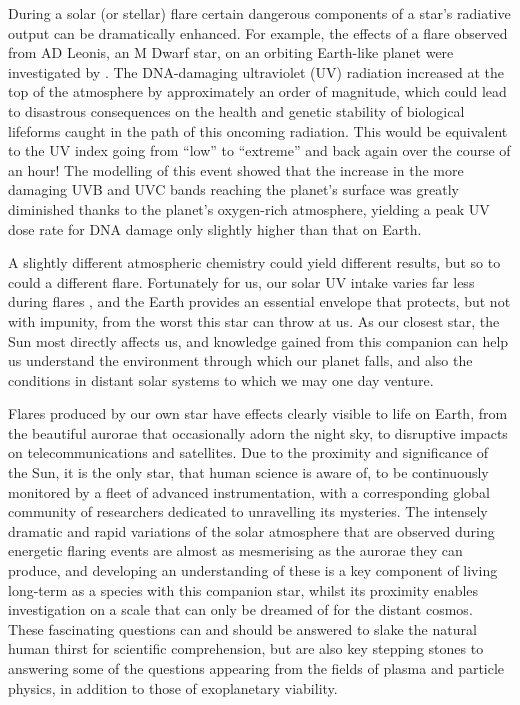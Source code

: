 During a solar (or stellar) flare certain dangerous components of a star's radiative output can be dramatically enhanced.
For example, the effects of a flare observed from AD Leonis, an M Dwarf star, on an orbiting Earth-like planet were investigated by \citet{Segura2010}.
The DNA-damaging ultraviolet (UV) radiation increased at the top of the atmosphere by approximately an order of magnitude, which could lead to disastrous consequences on the health and genetic stability of biological lifeforms caught in the path of this oncoming radiation.
This would be equivalent to the UV index going from ``low'' to ``extreme'' and back again over the course of an hour!
The modelling of this event showed that the increase in the more damaging UVB and UVC bands reaching the planet's surface was greatly diminished thanks to the planet's oxygen-rich atmosphere, yielding a peak UV dose rate for DNA damage only slightly higher than that on Earth.

A slightly different atmospheric chemistry could yield different results, but so to could a different flare.
Fortunately for us, our solar UV intake varies far less during flares \citep[e.g.][]{Woods2006}, and the Earth provides an essential envelope that protects, but not with impunity, from the worst this star can throw at us.
As our closest star, the Sun most directly affects us, and knowledge gained from this companion can help us understand the environment through which our planet falls, and also the conditions in distant solar systems to which we may one day venture.

Flares produced by our own star have effects clearly visible to life on Earth, from the beautiful aurorae that occasionally adorn the night sky, to disruptive impacts on telecommunications and satellites.
Due to the proximity and significance of the Sun, it is the only star, that human science is aware of, to be continuously monitored by a fleet of advanced instrumentation, with a corresponding global community of researchers dedicated to unravelling its mysteries.
The intensely dramatic and rapid variations of the solar atmosphere that are observed during energetic flaring events are almost as mesmerising as the aurorae they can produce, and developing an understanding of these is a key component of living long-term as a species with this companion star, whilst its proximity enables investigation on a scale that can only be dreamed of for the distant cosmos.
These fascinating questions can and should be answered to slake the natural human thirst for scientific comprehension, but are also key stepping stones to answering some of the questions appearing from the fields of plasma and particle physics, in addition to those of exoplanetary viability.

